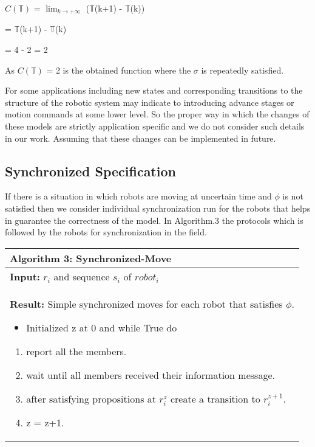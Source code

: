 \hspace{30pt}  $C(\mathbb{T})$ = $\lim_{k\to+\infty}$ ($\mathbb{T}$(k+1) - $\mathbb{T}$(k))

\hspace{30pt}  = $\mathbb{T}$(k+1) - $\mathbb{T}$(k)

\hspace{30pt}  = 4 - 2 = 2

 As $C(\mathbb{T})$ = 2 is the obtained function where the $\sigma$ is repeatedly satisfied.

 For some applications including new states and corresponding transitions to the structure of the robotic system may indicate to introducing advance stages or motion commands at some lower level. So the proper way in which the changes of these models are strictly application specific and we do not consider such details in our work. Assuming that these changes can be implemented in future.

 \subsection{Synchronized Specification}
 If there is a situation in which robots are moving at uncertain time and $\phi$ is not satisfied then we consider individual synchronization run for the robots that helps in guarantee the correctness of the model. In Algorithm.3 the protocols which is followed by the robots for synchronization in the field.

 \begin{center}
\begin{tabular}{ |p{13cm}| }
 \hline
 \textbf{Algorithm 3:} Synchronized-Move \\ \hline
\textbf{ Input:} $r_i$ and sequence $s_i$ of $robot_i$ \\
  \textbf{Result:} Simple synchronized moves for each robot that satisfies $\phi$.
  \begin{itemize}
    \item Initialized z at 0 and while True do
  \end{itemize}
    \begin{enumerate}
    \item report all the members.
    \item wait until all members received their information message.
    \item after satisfying propositions at $r_i^{z}$ create a transition to $r_i^{z+1}$.
    \item z = z+1.
  \end{enumerate}
 \\
 \hline
\end{tabular}
\end{center}


